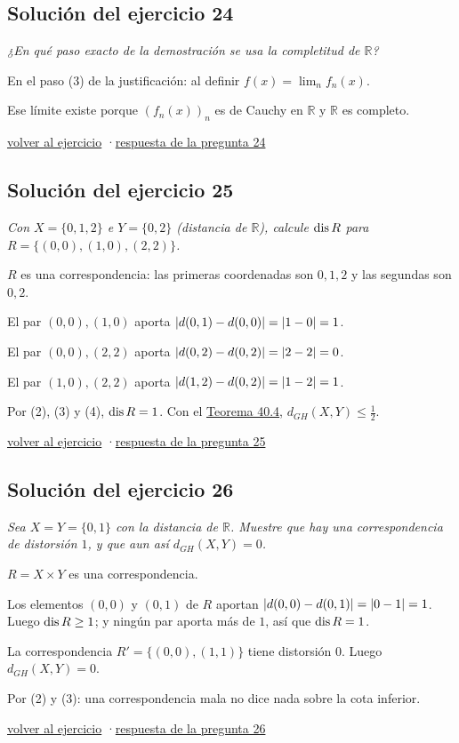 \documentclass[11pt,a4paper]{article}
\newcommand{\R}{\mathbb{R}}\newcommand{\N}{\mathbb{N}}\newcommand{\Q}{\mathbb{Q}}
\begin{document}
\subsection*{\hypertarget{s-24}{}Solución del ejercicio 24}
\emph{¿En qué paso exacto de la demostración se usa la completitud de $\R$?}
\begin{pasos}
\item[] En el paso (3) de la justificación: al definir $f(x)=\lim_nf_n(x)$.
\item[] Ese límite existe porque $(f_n(x))_n$ es de Cauchy en $\R$ y $\R$ es completo.
\end{pasos}
\par{\small \hyperlink{x-24}{volver al ejercicio} \quad·\quad \hyperlink{r-24}{respuesta de la pregunta 24}}
\subsection*{\hypertarget{s-25}{}Solución del ejercicio 25}
\emph{Con $X=\{0,1,2\}$ e $Y=\{0,2\}$ (distancia de $\R$), calcule $\operatorname{dis} R$ para $R=\{(0,0),(1,0),(2,2)\}$.}
\begin{pasos}
\item[(1)] $R$ es una correspondencia: las primeras coordenadas son $0,1,2$ y las segundas son $0,2$.
\item[(2)] El par $(0,0),(1,0)$ aporta $\lvert d(0,1)-d(0,0)\rvert=\lvert 1-0\rvert=1$.
\item[(3)] El par $(0,0),(2,2)$ aporta $\lvert d(0,2)-d(0,2)\rvert=\lvert 2-2\rvert=0$.
\item[(4)] El par $(1,0),(2,2)$ aporta $\lvert d(1,2)-d(0,2)\rvert=\lvert 1-2\rvert=1$.
\item[] Por (2), (3) y (4), $\operatorname{dis} R=1$. Con el \href{https://decostruttivismo.github.io/MAT2514-repaso/pdf/MAT2514_apuntes_completos.pdf\#nameddest=teorema.40.4}{Teorema 40.4}, $d_{GH}(X,Y)\le\frac12$.
\end{pasos}
\par{\small \hyperlink{x-25}{volver al ejercicio} \quad·\quad \hyperlink{r-25}{respuesta de la pregunta 25}}
\subsection*{\hypertarget{s-26}{}Solución del ejercicio 26}
\emph{Sea $X=Y=\{0,1\}$ con la distancia de $\R$. Muestre que hay una correspondencia de distorsión $1$, y que aun así $d_{GH}(X,Y)=0$.}
\begin{pasos}
\item[(1)] $R=X\times Y$ es una correspondencia.
\item[(2)] Los elementos $(0,0)$ y $(0,1)$ de $R$ aportan $\lvert d(0,0)-d(0,1)\rvert=\lvert 0-1\rvert=1$. Luego $\operatorname{dis} R\ge1$; y ningún par aporta más de $1$, así que $\operatorname{dis} R=1$.
\item[(3)] La correspondencia $R'=\{(0,0),(1,1)\}$ tiene distorsión $0$. Luego $d_{GH}(X,Y)=0$.
\item[] Por (2) y (3): una correspondencia mala no dice nada sobre la cota inferior.
\end{pasos}
\par{\small \hyperlink{x-26}{volver al ejercicio} \quad·\quad \hyperlink{r-26}{respuesta de la pregunta 26}}
\end{document}
